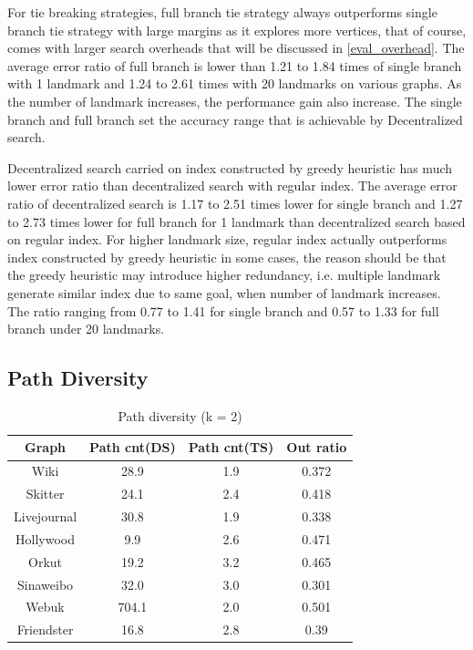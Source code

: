 For tie breaking strategies, full branch tie strategy always outperforms single branch tie strategy with large margins as it explores more vertices, that of course, comes with larger search overheads that will be discussed in \ref{eval_overhead}. The average error ratio of full branch is lower than 1.21 to 1.84 times of single branch with 1 landmark and 1.24 to 2.61 times with 20 landmarks on various graphs. As the number of landmark increases, the performance gain also increase. The single branch and full branch set the accuracy range that is achievable by Decentralized search.  

Decentralized search carried on index constructed by greedy heuristic has much lower error ratio than decentralized search with regular index. The average error ratio of decentralized search is 1.17 to 2.51 times lower for single branch and 1.27 to 2.73 times lower for full branch for 1 landmark than decentralized search based on regular index. For higher landmark size, regular index actually outperforms index constructed by greedy heuristic in some cases, the reason should be that the greedy heuristic may introduce higher redundancy, i.e. multiple landmark generate similar index due to same goal, when number of landmark increases. The ratio ranging from 0.77 to 1.41 for single branch and 0.57 to 1.33 for full branch under 20 landmarks.

\subsection{Path Diversity}
\label{eval_diversity}

\begin{table}
	\caption{Path diversity (k = 2)}
    \label{table:pdiv}
    \centering
    \begin{tabular}{c|ccc} \hline
				Graph&Path cnt(DS)&Path cnt(TS)&Out ratio \\ \hline
				Wiki&28.9&1.9&0.372 \\ 
				Skitter&24.1&2.4&0.418 \\ 
				Livejournal&30.8&1.9&0.338 \\ 
				Hollywood&9.9&2.6&0.471 \\ 
				Orkut&19.2&3.2&0.465 \\ 
				Sinaweibo&32.0&3.0&0.301 \\ 
				Webuk&704.1&2.0&0.501 \\ 
				Friendster&16.8&2.8&0.39 \\ \hline
    \end{tabular}
\end{table}

